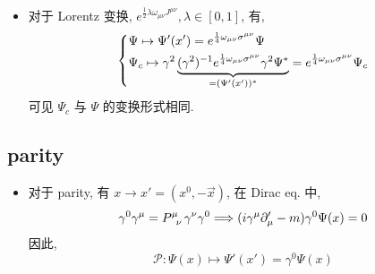 \begin{itemize}
	\item 对于 Lorentz 变换, $e^{\frac{1}{2} \lambda \omega_{\mu \nu} J^{\mu \nu}}, \lambda \in [0, 1]$, 有,
	\begin{equation}
		\begin{dcases}
			\Psi \mapsto \Psi'(x') = e^{\frac{1}{4} \omega_{\mu \nu} \sigma^{\mu \nu}} \Psi \\
			\Psi_c \mapsto \gamma^2 \underbrace{(\gamma^2)^{- 1}  e^{\frac{1}{4} \omega_{\mu \nu} \sigma^{\mu \nu}} \gamma^2 \Psi^*}_{= (\Psi'(x'))^*} = e^{\frac{1}{4} \omega_{\mu \nu} \sigma^{\mu \nu}} \Psi_c
		\end{dcases}
	\end{equation}
	可见 $\Psi_c$ 与 $\Psi$ 的变换形式相同.
\end{itemize}

\subsection{parity}
\begin{itemize}
	\item 对于 parity, 有 $x \rightarrow x' = (x^0, - \vec{x})$, 在 Dirac eq. 中,
	\begin{equation}
		\gamma^0 \gamma^\mu = \tensor{P}{^\mu_\nu} \gamma^\nu \gamma^0 \Longrightarrow (i \gamma^\mu \partial'_\mu - m) \gamma^0 \Psi(x) = 0
	\end{equation}
	因此,
	\begin{equation}
		\mathcal{P} : \Psi(x) \mapsto \Psi'(x') = \gamma^0 \Psi(x)
	\end{equation}
\end{itemize}

